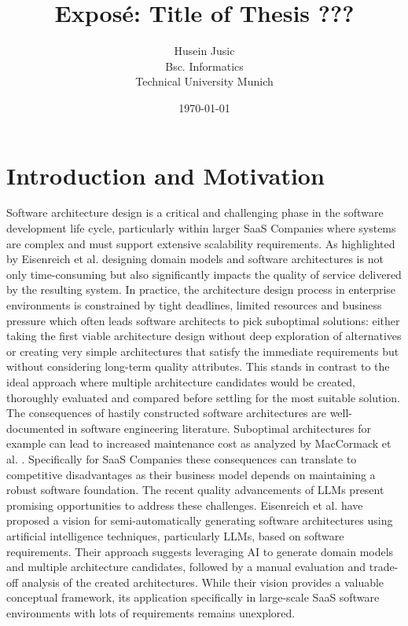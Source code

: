 \documentclass[12pt,a4paper]{article}
\title{Exposé: Title of Thesis ???}
\author{Husein Jusic \\ Bsc. Informatics \\ Technical University Munich}
\date{\today}
\begin{document}
\maketitle
\thispagestyle{empty}

\section{Introduction and Motivation}
Software architecture design is a critical and challenging phase in the software development life cycle, particularly within larger SaaS Companies where systems are complex and must support extensive scalability requirements. As highlighted by Eisenreich et al. \autocite{eisenreich2024} designing domain models and software architectures is not only time-consuming but also significantly impacts the quality of service delivered by the resulting system. \newline In practice, the architecture design process in enterprise environments is constrained by tight deadlines, limited resources and business pressure which often leads software architects to pick suboptimal solutions: either taking the first viable architecture design without deep exploration of alternatives or creating very simple architectures that satisfy the immediate requirements but without considering long-term quality attributes. This stands in contrast to the ideal approach where multiple architecture candidates would be created, thoroughly evaluated and compared before settling for the most suitable solution. \newline The consequences of hastily constructed software architectures are well-documented in software engineering literature. Suboptimal architectures for example can lead to increased maintenance cost as analyzed by MacCormack et al. \autocite{MACCORMACK2016170}. Specifically for SaaS Companies these consequences can translate to competitive disadvantages as their business model depends on maintaining a robust software foundation. \newline The recent quality advancements of LLMs present promising opportunities to address these challenges. Eisenreich et al. \cite{eisenreich2024} have proposed a vision for semi-automatically generating software architectures using artificial intelligence techniques, particularly LLMs, based on software requirements. Their approach suggests leveraging AI to generate domain models and multiple architecture candidates, followed by a manual evaluation and trade-off analysis of the created architectures. \newline While their vision provides a valuable conceptual framework, its application specifically in large-scale SaaS software environments with lots of requirements remains unexplored. \newline
\end{document}
